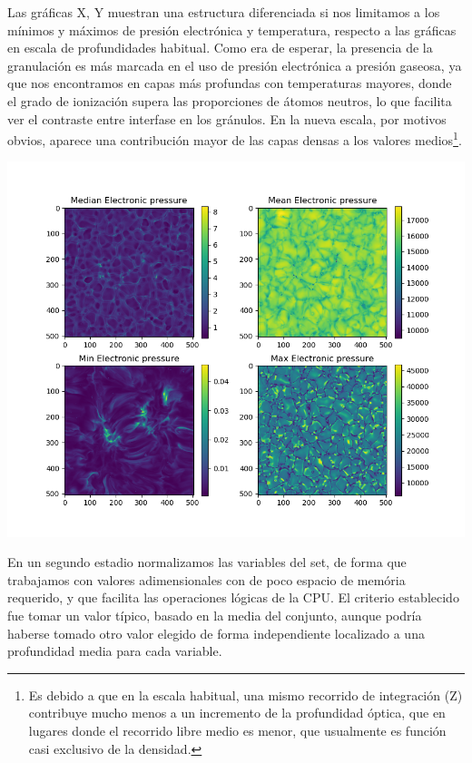 \documentclass[8pt]{article}
\begin{document}
		Las gráficas X, Y muestran una estructura diferenciada si nos limitamos a los mínimos y máximos de presión electrónica y temperatura, respecto a las gráficas en escala de profundidades habitual. Como era de esperar, la presencia de la granulación es más marcada en el uso de presión electrónica a presión gaseosa, ya que nos encontramos en capas más profundas con temperaturas mayores, donde el grado de ionización supera las proporciones de átomos neutros, lo que facilita ver el contraste entre interfase en los gránulos. En la nueva escala, por motivos obvios, aparece una contribución mayor de las capas densas a los valores medios\footnote{Es debido a que en la escala habitual, una mismo recorrido de integración (Z) contribuye mucho menos a un incremento de la profundidad óptica, que en lugares donde el recorrido libre medio es menor, que usualmente es función casi exclusivo de la densidad.}. 		
		
		\center \includegraphics[scale=0.5]{Pressure-OK.png}		
		
		
			

	 
	   
		En un segundo estadio normalizamos las variables del set, de forma que trabajamos con valores adimensionales con de poco espacio de memória requerido, y que facilita las operaciones lógicas de la CPU. El criterio establecido fue tomar un valor típico, basado en la media del conjunto, aunque podría haberse tomado otro valor elegido de forma independiente localizado a una profundidad media para cada variable. \newline
		
\end{document}
